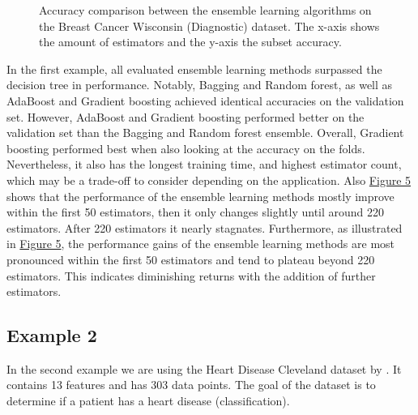 \begin{figure}[htbp]
    \centering
    \label{fig:bcw_comparison}
    \caption{
        Accuracy comparison between the ensemble learning algorithms on the Breast Cancer 
        Wisconsin (Diagnostic) dataset.
        The x-axis shows the amount of estimators and the y-axis the subset accuracy.
    }
\end{figure}

In the first example, all evaluated ensemble learning methods surpassed the decision tree in performance.
Notably, Bagging and Random forest, as well as AdaBoost and Gradient boosting achieved identical accuracies
on the validation set. However, AdaBoost and Gradient boosting performed better on the validation set than
the Bagging and Random forest ensemble.
Overall, Gradient boosting performed best when also looking at the accuracy on the folds. Nevertheless,
it also has the longest training time, and highest estimator count, which may be a trade-off to 
consider depending on the application.
Also \hyperref[fig:bcw_comparison]{Figure 5} shows that the performance of the ensemble learning 
methods mostly improve within the first 50 estimators, then it only changes slightly until around 220 estimators.
After 220 estimators it nearly stagnates.
Furthermore, as illustrated in \hyperref[fig:bcw_comparison]{Figure 5}, the performance gains of the ensemble
learning methods are most pronounced within the first 50 estimators and tend to plateau beyond 220 estimators.
This indicates diminishing returns with the addition of further estimators.

\newpage %
\subsection{Example 2}
In the second example we are using the Heart Disease Cleveland dataset by
\citet*{heart_disease_cleveland}. It contains 13 features and has 303 data 
points. The goal of the dataset is to determine if a patient has a heart
disease (classification).

